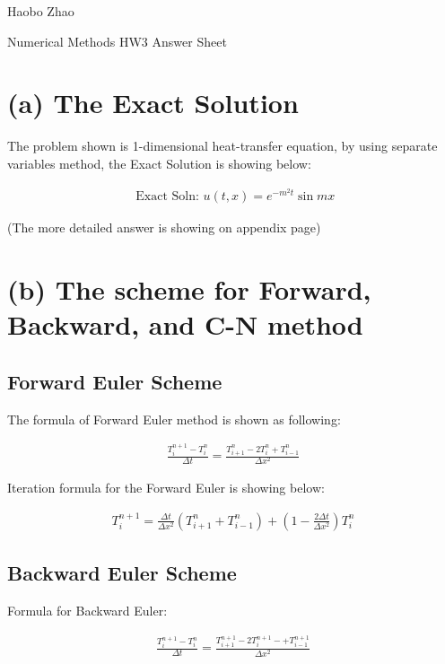 \documentclass[12pt]{article}
\begin{document}
Haobo Zhao


Numerical Methods HW3 Answer Sheet



\section{(a) The Exact Solution}

The problem shown is 1-dimensional heat-transfer equation, by using separate variables method, the Exact Solution is showing below:

\begin{align}
\text { Exact Soln: } u(t, x)=e^{-m^2 t} \sin m x
\end{align}

(The more detailed answer is showing on appendix page)





\section{(b) The scheme for Forward, Backward, and C-N method}

\subsection{Forward Euler Scheme}

The formula of Forward Euler method is shown as following:

\begin{align}
\frac{T_i^{n+1}-{T_i^n}}{\Delta t}=\frac{T_{i+1}^n-2 T_i^n+T_{i-1}^n}{\Delta x^2}
\end{align}


Iteration formula for the Forward Euler is showing below:  

\begin{align}
T_i^{n+1}=\frac{\Delta t}{\Delta x^2}\left(T_{i+1}^n+T_{i-1}^n\right)+\left(1-\frac{2 \Delta t}{\Delta x^2}\right) T_i^n
\end{align}

\subsection{Backward Euler Scheme}

Formula for Backward Euler:

\begin{align}
\frac{T_i^{n+1}-{T_i^n}}{\Delta t}=\frac{T_{i+1}^{n+1}-2 T_i^{n+1}-+T_{i-1}^{n+1}}{\Delta x^2}
\end{align}
\end{document}
